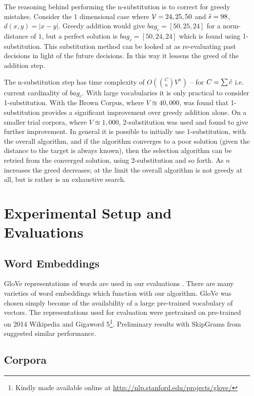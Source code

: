 \documentclass{llncs}
\begin{document}
The reasoning behind performing the n-substitution is to correct for greedy mistakes. Consider the 1 dimensional case where $\mathcal{V}={24,25,50}$ and $\tilde{s}=98$, $d(x,y)=\left|x-y\right|$. Greedy addition would give  $bag_c=[50,25,24]$ for a norm-distance of $1$, but a perfect solution  is $bag_c=[50,24,24]$ which is found using 1-substitution. This substitution method can be looked at as re-evaluating past decisions in light of the future decisions. In this way it lessens the greed of the addition step. 

The n-substitution step has time complexity of $O(\binom{C}{n}V^n)$  -- for $C=\sum \tilde{c}$ i.e. current cardinality of $bag_c$. With large vocabularies it is only practical to consider 1-substitution. With the Brown Corpus, where $V\approxeq 40,000$, was found that 1-substitution provides a significant improvement over greedy addition alone. On a smaller trial corpora, where $V\approxeq 1,000$, 2-substitution was used and found to give further improvement. In general it is possible to initially use 1-substitution, with the overall algorithm, and if the algorithm converges to a poor solution (given the distance to the target is always known), then the selection algorithm can be retried from the converged solution, using 2-substitution and so forth. As $n$ increases the greed decreases; at the limit the overall algorithm is not greedy at all, but is rather is an exhaustive search.


\section{Experimental Setup and Evaluations} \label{evalsettings}


\subsection{Word Embeddings}
GloVe representations of words are used in our evaluations \parencite{pennington2014glove}. There are many varieties of word embeddings which function with our algorithm. GloVe was chosen simply become of the availability of a large pre-trained vocabulary of vectors. The representations used for evaluation were pretrained on pre-trained on 2014 Wikipedia and Gigaword 5\footnote{Kindly made available online at \url{http://nlp.stanford.edu/projects/glove/}}. Preliminary results with SkipGrams from \textcite{mikolov2013efficient} suggested similar performance.

\subsection{Corpora}
\end{document}

